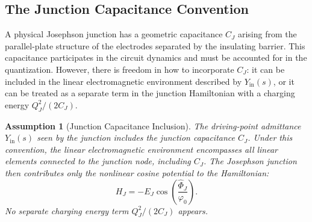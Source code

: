 \documentclass[reprint, floatfix, superscriptaddress, amsmath, amssymb, longbibliography]{revtex4-2}
\newtheorem{assumption}[theorem]{Assumption}
\begin{document}
\subsection{The Junction Capacitance Convention}
\label{sec:cj_convention_subsec}

A physical Josephson junction has a geometric capacitance $C_J$ arising from the parallel-plate structure of the electrodes separated by the insulating barrier. This capacitance participates in the circuit dynamics and must be accounted for in the quantization. However, there is freedom in how to incorporate $C_J$: it can be included in the linear electromagnetic environment described by $Y_{\mathrm{in}}(s)$, or it can be treated as a separate term in the junction Hamiltonian with a charging energy $Q_J^2/(2C_J)$.

\begin{assumption}[Junction Capacitance Inclusion]
\label{assumption:cj_convention}
The driving-point admittance $Y_{\mathrm{in}}(s)$ seen by the junction includes the junction capacitance $C_J$. Under this convention, the linear electromagnetic environment encompasses all linear elements connected to the junction node, including $C_J$. The Josephson junction then contributes only the nonlinear cosine potential to the Hamiltonian:
\begin{equation}
H_J = -E_J\cos\left(\frac{\hat{\Phi}_J}{\varphi_0}\right).
\label{eq:junction_hamiltonian}
\end{equation}
No separate charging energy term $Q_J^2/(2C_J)$ appears.
\end{assumption}
\end{document}
